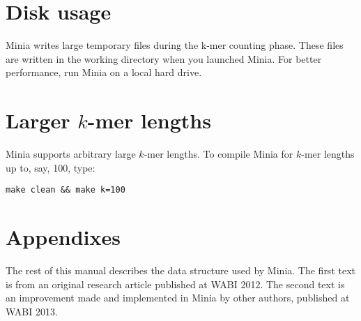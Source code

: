 \documentclass[a4paper]{article}
\begin{document}
\section{Disk usage}

Minia writes large temporary files during the k-mer counting phase. These files are written in the working directory when you launched Minia. For better performance, run Minia on a local hard drive. 

\section{Larger $k$-mer lengths}

Minia supports arbitrary large $k$-mer lengths. To compile Minia for $k$-mer lengths up to, say, 100, type:
\begin{verbatim}
make clean && make k=100
\end{verbatim}

\section{Appendixes}

The rest of this manual describes the data structure used by Minia.
The first text is from an original research article published at WABI 2012. The second text is an improvement made and implemented in Minia by other authors, published at WABI 2013.

%
%
\end{document}

